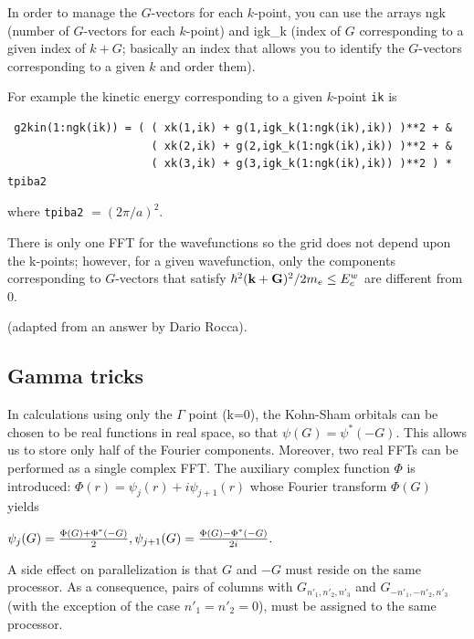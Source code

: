 \documentclass[12pt,a4paper]{article}
\begin{document}
In order to manage the $G$-vectors for each $k$-point, you can use the arrays
ngk (number of $G$-vectors for each $k$-point) and igk\_k (index of $G$
corresponding to a given index of $k+G$; basically an index that allows
you to identify the $G$-vectors corresponding to a given $k$ and order them).

For example the kinetic energy corresponding to a given $k$-point \texttt{ik}
is
\begin{verbatim}
 g2kin(1:ngk(ik)) = ( ( xk(1,ik) + g(1,igk_k(1:ngk(ik),ik)) )**2 + &
                      ( xk(2,ik) + g(2,igk_k(1:ngk(ik),ik)) )**2 + &
                      ( xk(3,ik) + g(3,igk_k(1:ngk(ik),ik)) )**2 ) * tpiba2
\end{verbatim}
where \texttt{tpiba2} $= (2\pi/a)^2$.

There is only one FFT for the wavefunctions so the grid does not depend
upon the k-points; however, for a given wavefunction, only the components
corresponding to $G$-vectors that satisfy
$ { \hbar^2 ({\bf k}+{\bf G})^2 / 2m_e} \le E^w_c$
are different from 0.

(adapted from an answer by Dario Rocca).

\subsection{Gamma tricks}

In calculations using only the $\Gamma$ point (k=0),
the Kohn-Sham orbitals can be chosen to be real functions in
real space, so that
$
  \psi(G) = \psi^*(-G).
$
This allows us to store only half of the Fourier components.
Moreover, two real FFTs can be performed as a single complex FFT.
The auxiliary complex function $\Phi$ is introduced:
$
    \Phi(r) = \psi_j(r)+ i \psi_{j+1}(r)
$
whose Fourier transform $\Phi(G)$ yields

$
   \psi_j    (G) =  {\Phi(G) + \Phi^*(-G)\over 2},
   \psi_{j+1}(G) =  {\Phi(G) - \Phi^*(-G)\over 2i}.
$

A side effect on parallelization is that $G$ and $-G$ must
reside on the same processor. As a consequence, pairs of columns
with $G_{n'_1,n'_2,n'_3}$ and $G_{-n'_1,-n'_2,n'_3}$
(with the exception of the case $n'_1=n'_2=0$),
must be assigned to the same processor.
\end{document}
